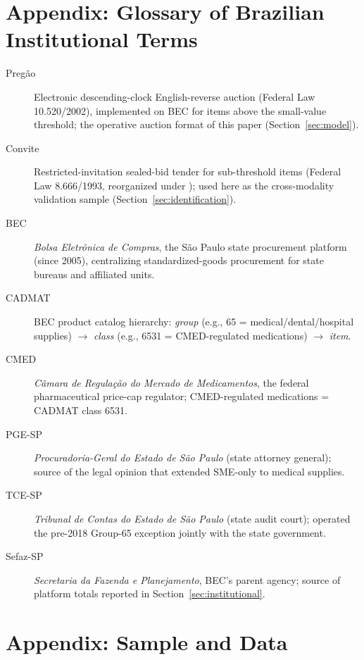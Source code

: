 \clearpage
\appendix

\section{Appendix: Glossary of Brazilian Institutional Terms}\label{app:glossary}

\begin{description}
\item[Preg\~ao] Electronic descending-clock English-reverse auction (Federal Law 10.520/2002), implemented on BEC for items above the small-value threshold; the operative auction format of this paper (Section~\ref{sec:model}).
\item[Convite] Restricted-invitation sealed-bid tender for sub-threshold items (Federal Law 8.666/1993, reorganized under \leiNova); used here as the cross-modality validation sample (Section~\ref{sec:identification}).
\item[BEC] \emph{Bolsa Eletr\^onica de Compras}, the S\~ao Paulo state procurement platform (since 2005), centralizing standardized-goods procurement for state bureaus and affiliated units.
\item[CADMAT] BEC product catalog hierarchy: \emph{group} (e.g., 65 = medical/dental/hospital supplies) $\to$ \emph{class} (e.g., 6531 = CMED-regulated medications) $\to$ \emph{item}.
\item[CMED] \emph{C\^amara de Regula\c{c}\~ao do Mercado de Medicamentos}, the federal pharmaceutical price-cap regulator; CMED-regulated medications = CADMAT class 6531.
\item[PGE-SP] \emph{Procuradoria-Geral do Estado de S\~ao Paulo} (state attorney general); source of the \policyCutoffMonth{} legal opinion that extended SME-only to medical supplies.
\item[TCE-SP] \emph{Tribunal de Contas do Estado de S\~ao Paulo} (state audit court); operated the pre-2018 Group-65 exception jointly with the state government.
\item[Sefaz-SP] \emph{Secretaria da Fazenda e Planejamento}, BEC's parent agency; source of platform totals reported in Section~\ref{sec:institutional}.
\end{description}

\section{Appendix: Sample and Data}\label{app:sample}


